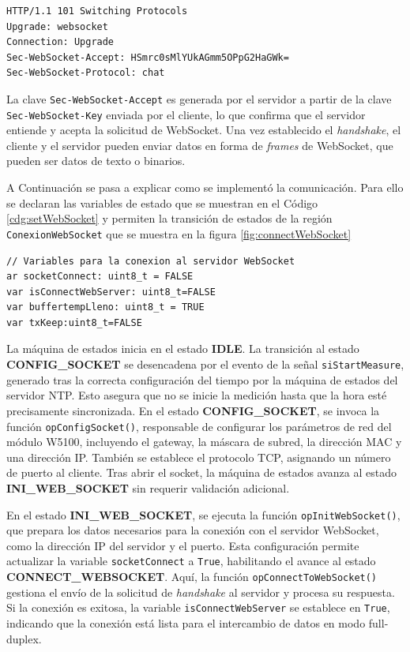 \begin{verbatim}
HTTP/1.1 101 Switching Protocols
Upgrade: websocket
Connection: Upgrade
Sec-WebSocket-Accept: HSmrc0sMlYUkAGmm5OPpG2HaGWk=
Sec-WebSocket-Protocol: chat
\end{verbatim}

La clave \texttt{Sec-WebSocket-Accept} es generada por el servidor a partir de la clave \texttt{Sec-WebSocket-Key} enviada por el cliente, lo que confirma que el servidor entiende y acepta la solicitud de WebSocket. Una vez establecido el \textit{handshake}, el cliente y el servidor pueden enviar datos en forma de \textit{frames} de WebSocket, que pueden ser datos de texto o binarios.

A Continuación se pasa a explicar como se implementó la comunicación. Para ello se declaran las variables de estado que se muestran en el Código \ref{cdg:setWebSocket} y permiten la transición de estados de la región \texttt{ConexionWebSocket} que se muestra en la figura \ref{fig:connectWebSocket}

\begin{lstlisting}[style=yakindustyle, caption={Declaración de variables booleanas para validar la conexion con el servidor WebSocket.}, label=cdg:setWebSocket]
// Variables para la conexion al servidor WebSocket
ar socketConnect: uint8_t = FALSE
var isConnectWebServer: uint8_t=FALSE
var buffertempLleno: uint8_t = TRUE
var txKeep:uint8_t=FALSE
\end{lstlisting}

La máquina de estados inicia en el estado \textbf{IDLE}. La transición al estado \textbf{CONFIG\_SOCKET} se desencadena por el evento de la señal \texttt{siStartMeasure}, generado tras la correcta configuración del tiempo por la máquina de estados del servidor NTP. Esto asegura que no se inicie la medición hasta que la hora esté precisamente sincronizada. En el estado \textbf{CONFIG\_SOCKET}, se invoca la función \texttt{opConfigSocket()}, responsable de configurar los parámetros de red del módulo W5100, incluyendo el gateway, la máscara de subred, la dirección MAC y una dirección IP. También se establece el protocolo TCP, asignando un número de puerto al cliente. Tras abrir el socket, la máquina de estados avanza al estado \textbf{INI\_WEB\_SOCKET} sin requerir validación adicional.

En el estado \textbf{INI\_WEB\_SOCKET}, se ejecuta la función \texttt{opInitWebSocket()}, que prepara los datos necesarios para la conexión con el servidor WebSocket, como la dirección IP del servidor y el puerto. Esta configuración permite actualizar la variable \texttt{socketConnect} a \texttt{True}, habilitando el avance al estado \textbf{CONNECT\_WEBSOCKET}. Aquí, la función \texttt{opConnectToWebSocket()} gestiona el envío de la solicitud de \textit{handshake} al servidor y procesa su respuesta. Si la conexión es exitosa, la variable \texttt{isConnectWebServer} se establece en \texttt{True}, indicando que la conexión está lista para el intercambio de datos en modo full-duplex.

